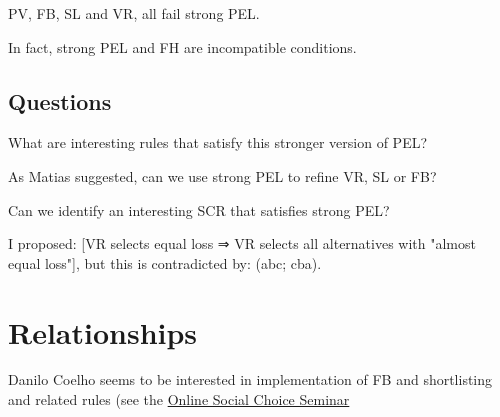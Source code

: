 \documentclass[version=3.21, pagesize, twoside=off, bibliography=totoc, DIV=calc, fontsize=12pt, a4paper]{scrartcl}
\begin{document}
PV, FB, SL and VR, all fail strong PEL. 

In fact, strong PEL and FH are incompatible conditions. 

\subsection{Questions}
What are interesting rules that satisfy this stronger version of PEL? 

As Matias suggested, can we use strong PEL to refine VR, SL or FB?

Can we identify an interesting SCR that satisfies strong PEL?

I proposed: [VR selects equal loss ⇒ VR selects all alternatives with "almost equal loss"], but this is contradicted by: (abc; cba).

\section{Relationships}
Danilo Coelho seems to be interested in implementation of FB and shortlisting and related rules (see the \href{https://www.cmss.auckland.ac.nz/2020/06/03/online-social-choice-seminar-series/}{Online Social Choice Seminar}

%
\end{document}
